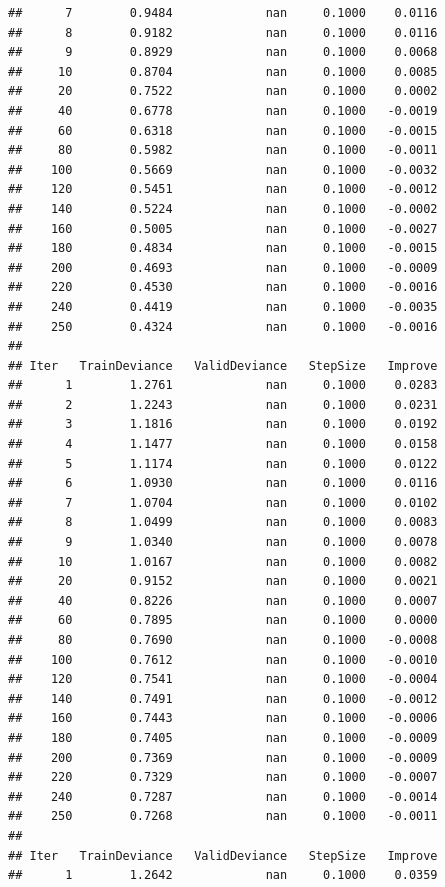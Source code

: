 \documentclass[]{book}
\begin{document}
\begin{verbatim}
##      7        0.9484             nan     0.1000    0.0116
##      8        0.9182             nan     0.1000    0.0116
##      9        0.8929             nan     0.1000    0.0068
##     10        0.8704             nan     0.1000    0.0085
##     20        0.7522             nan     0.1000    0.0002
##     40        0.6778             nan     0.1000   -0.0019
##     60        0.6318             nan     0.1000   -0.0015
##     80        0.5982             nan     0.1000   -0.0011
##    100        0.5669             nan     0.1000   -0.0032
##    120        0.5451             nan     0.1000   -0.0012
##    140        0.5224             nan     0.1000   -0.0002
##    160        0.5005             nan     0.1000   -0.0027
##    180        0.4834             nan     0.1000   -0.0015
##    200        0.4693             nan     0.1000   -0.0009
##    220        0.4530             nan     0.1000   -0.0016
##    240        0.4419             nan     0.1000   -0.0035
##    250        0.4324             nan     0.1000   -0.0016
## 
## Iter   TrainDeviance   ValidDeviance   StepSize   Improve
##      1        1.2761             nan     0.1000    0.0283
##      2        1.2243             nan     0.1000    0.0231
##      3        1.1816             nan     0.1000    0.0192
##      4        1.1477             nan     0.1000    0.0158
##      5        1.1174             nan     0.1000    0.0122
##      6        1.0930             nan     0.1000    0.0116
##      7        1.0704             nan     0.1000    0.0102
##      8        1.0499             nan     0.1000    0.0083
##      9        1.0340             nan     0.1000    0.0078
##     10        1.0167             nan     0.1000    0.0082
##     20        0.9152             nan     0.1000    0.0021
##     40        0.8226             nan     0.1000    0.0007
##     60        0.7895             nan     0.1000    0.0000
##     80        0.7690             nan     0.1000   -0.0008
##    100        0.7612             nan     0.1000   -0.0010
##    120        0.7541             nan     0.1000   -0.0004
##    140        0.7491             nan     0.1000   -0.0012
##    160        0.7443             nan     0.1000   -0.0006
##    180        0.7405             nan     0.1000   -0.0009
##    200        0.7369             nan     0.1000   -0.0009
##    220        0.7329             nan     0.1000   -0.0007
##    240        0.7287             nan     0.1000   -0.0014
##    250        0.7268             nan     0.1000   -0.0011
## 
## Iter   TrainDeviance   ValidDeviance   StepSize   Improve
##      1        1.2642             nan     0.1000    0.0359

\end{verbatim}
\end{document}
